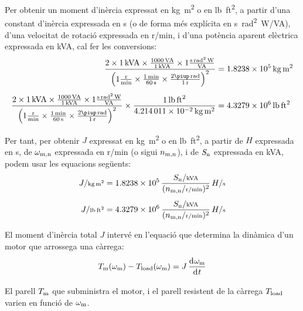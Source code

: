 Per  obtenir un moment d'inèrcia expressat en \unit{kg.m^2} o en \unit{lb.ft^2}, a partir d'una constant d'inèrcia  expressada en \unit{s} (o de forma més explícita en \unit{s.rad^2.W/VA}), d'una velocitat de rotació expressada en \unit{r/min}, i d'una potència aparent elèctrica expressada en \unit{kVA}, cal  fer les conversions:
\begin{subequations}
\begin{align}
    \frac{2\times \qty{1}{kVA} \times \frac{\qty{1000}{VA}}{\qty{1}{kVA}} \times 1 \frac{\unit{s.rad^2.W}}{\unit{VA}}}{\left(1\frac{\unit{r}}{\unit{min}} \times \frac{\qty{1}{min}}{\qty{60}{s}} \times \frac{2\piup\,\unit{rad}}{\qty{1}{r}}\right)^2}  &= \qty{1,8238e5}{kg.m^2} \\[1ex]
    \frac{2\times \qty{1}{kVA} \times \frac{\qty{1000}{VA}}{\qty{1}{kVA}} \times 1 \frac{\unit{s.rad^2.W}}{\unit{VA}}}{\left(1\frac{\unit{r}}{\unit{min}} \times \frac{\qty{1}{min}}{\qty{60}{s}} \times \frac{2\piup\,\unit{rad}}{\qty{1}{r}}\right)^2}  \times \frac{\qty{1}{lb.ft^2}}{\qty{4,214011e-2}{kg.m^2}} &= \qty{4,3279e6}{lb.ft^2}
\end{align}
\end{subequations}

Per tant, per  obtenir $J$  expressat en \unit{kg.m^2} o en \unit{lb.ft^2}, a partir de $H$ expressada en \unit{s}, de $\omega_\mathrm{m,n}$ expressada en \unit{r/min} (o sigui $n_\mathrm{m,n}$), i de $S_\mathrm{n}$ expressada en \unit{kVA}, podem usar les equacions següents:
\begin{subequations}
\begin{align}
     J/{\scriptstyle \unit{kg.m^2}} &= \num{1,8238e5}\,  \frac{S\ped{n}/{\scriptstyle \unit{kVA}}}{(n\ped{m,n}/{\scriptstyle \unit{r/min}})^2} \, H/{\scriptstyle \unit{s}}\\[1ex]
    J/{\scriptstyle \unit{lb.ft^2}} &= \num{4,3279e6}\,  \frac{S\ped{n}/{\scriptstyle \unit{kVA}}}{(n\ped{m,n}/{\scriptstyle \unit{r/min}})^2} \, H/{\scriptstyle \unit{s}}
\end{align}
\end{subequations}

El moment d'inèrcia total $J$ intervé en l'equació que  determina la dinàmica d'un motor que arrossega una càrrega:
\begin{equation}\label{eq:Tm-Tl-vel}
    T\ped{m}(\omega\ped{m}) - T\ped{load}(\omega\ped{m}) = J\,\frac{\diff \omega\ped{m}}{\diff t}
\end{equation}

El parell $T_\mathrm{m}$ que subministra el motor, i el parell resistent de la càrrega $T_\mathrm{load}$ varien en funció de $\omega_\mathrm{m}$.

